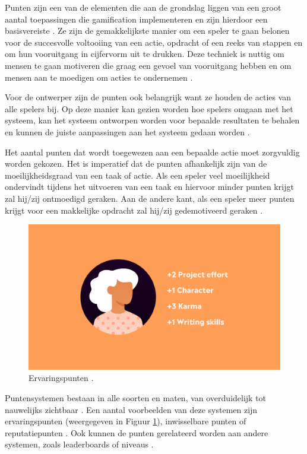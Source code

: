 Punten zijn een van de elementen die aan de grondslag liggen van een groot aantal toepassingen die gamification implementeren en zijn hierdoor een basisvereiste \autocite{Sailer2016}. Ze zijn de gemakkelijkste manier om een speler te gaan belonen voor de succesvolle voltooiing van een actie, opdracht of een reeks van stappen en om hun vooruitgang in cijfervorm uit te drukken. Deze techniek is nuttig om mensen te gaan motiveren die graag een gevoel van vooruitgang hebben en om mensen aan te moedigen om acties te ondernemen \autocite{Costa2019}.

Voor de ontwerper zijn de punten ook belangrijk want ze houden de acties van alle spelers bij. Op deze manier kan gezien worden hoe spelers omgaan met het systeem, kan het systeem ontworpen worden voor bepaalde resultaten te behalen en kunnen de juiste aanpassingen aan het systeem gedaan worden \autocite{Zichermann2011}.

Het aantal punten dat wordt toegewezen aan een bepaalde actie moet zorgvuldig worden gekozen. Het is imperatief dat de punten afhankelijk zijn van de moeilijkheidsgraad van een taak of actie. Als een speler veel moeilijkheid ondervindt tijdens het uitvoeren van een taak en hiervoor minder punten krijgt zal hij/zij ontmoedigd geraken. Aan de andere kant, als een speler meer punten krijgt voor een makkelijke opdracht zal hij/zij gedemotiveerd geraken \autocite{Costa2019}.

\begin{figure}
    \includegraphics[width=\linewidth]{Points.png}
    \caption{Ervaringspunten \autocite{Points2018}.}
    \label{fig:points}
\end{figure}

Puntensystemen bestaan in alle soorten en maten, van overduidelijk tot nauwelijks zichtbaar \autocite{Zichermann2011}. Een aantal voorbeelden van deze systemen zijn ervaringspunten (weergegeven in Figuur \ref{fig:points}), inwisselbare punten of reputatiepunten \autocite{Sailer2016}. Ook kunnen de punten gerelateerd worden aan andere systemen, zoals leaderboards of niveaus \autocite{Costa2019}.

